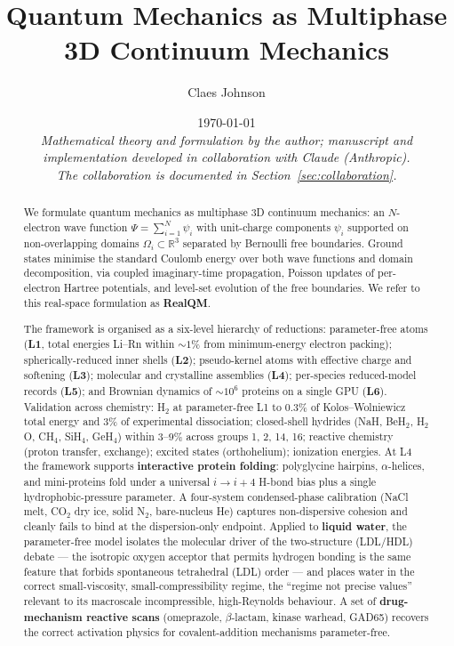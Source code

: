 \documentclass[11pt]{article}
\title{Quantum Mechanics as Multiphase 3D Continuum Mechanics}
\author[1]{Claes Johnson}
\affil[1]{KTH Royal Institute of Technology, Stockholm, Sweden \\
\texttt{claesjohnson@gmail.com}}
\date{\today \\[0.4em]
\small\textit{Mathematical theory and formulation by the author; manuscript and} \\
\small\textit{implementation developed in collaboration with Claude (Anthropic).} \\
\small\textit{The collaboration is documented in Section~\ref{sec:collaboration}.}}
\begin{document}
\maketitle

\begin{abstract}
We formulate quantum mechanics as multiphase 3D continuum mechanics: an $N$-electron wave function $\Psi = \sum_{i=1}^{N} \psi_i$ with unit-charge components $\psi_i$ supported on non-overlapping domains $\Omega_i \subset \mathbb{R}^3$ separated by Bernoulli free boundaries. Ground states minimise the standard Coulomb energy over both wave functions and domain decomposition, via coupled imaginary-time propagation, Poisson updates of per-electron Hartree potentials, and level-set evolution of the free boundaries. We refer to this real-space formulation as \textbf{RealQM}.

The framework is organised as a six-level hierarchy of reductions: parameter-free atoms (\textbf{L1}, total energies Li--Rn within ${\sim}1\%$ from minimum-energy electron packing); spherically-reduced inner shells (\textbf{L2}); pseudo-kernel atoms with effective charge and softening (\textbf{L3}); molecular and crystalline assemblies (\textbf{L4}); per-species reduced-model records (\textbf{L5}); and Brownian dynamics of $\sim 10^6$ proteins on a single GPU (\textbf{L6}). Validation across chemistry: H$_2$ at parameter-free L1 to $0.3\%$ of Kolos--Wolniewicz total energy and $3\%$ of experimental dissociation; closed-shell hydrides (NaH, BeH$_2$, H$_2$O, CH$_4$, SiH$_4$, GeH$_4$) within $3$--$9\%$ across groups 1, 2, 14, 16; reactive chemistry (proton transfer, exchange); excited states (orthohelium); ionization energies. At L4 the framework supports \textbf{interactive protein folding}: polyglycine hairpins, $\alpha$-helices, and mini-proteins fold under a universal $i{\to}i{+}4$ H-bond bias plus a single hydrophobic-pressure parameter. A four-system condensed-phase calibration (NaCl melt, CO$_2$ dry ice, solid N$_2$, bare-nucleus He) captures non-dispersive cohesion and cleanly fails to bind at the dispersion-only endpoint. Applied to \textbf{liquid water}, the parameter-free model isolates the molecular driver of the two-structure (LDL/HDL) debate --- the isotropic oxygen acceptor that permits hydrogen bonding is the same feature that forbids spontaneous tetrahedral (LDL) order --- and places water in the correct small-viscosity, small-compressibility regime, the ``regime not precise values'' relevant to its macroscale incompressible, high-Reynolds behaviour. A set of \textbf{drug-mechanism reactive scans} (omeprazole, $\beta$-lactam, kinase warhead, GAD65) recovers the correct activation physics for covalent-addition mechanisms parameter-free.


\end{abstract}
\end{document}

